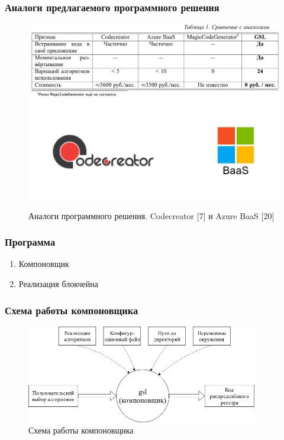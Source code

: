 \documentclass{beamer}
\begin{document}
\begin{frame}
    \frametitle{Аналоги предлагаемого программного решения}
    \begin{figure}
        \centering
        \includegraphics[width=\columnwidth]{analogues}
        \includegraphics[width=0.6\columnwidth]{analogues_logos}
        \caption{\scriptsize Аналоги программного решения. Codecreator [7] и Azure BaaS [20]}
    \end{figure}
\end{frame}

\begin{frame}[c]
    \frametitle{Программа}
    \Large
    \begin{center}
    \begin{enumerate}
        \item Компоновщик
        \item Реализация блокчейна
    \end{enumerate}
    \end{center}
\end{frame}

\begin{frame}
    \frametitle{Схема работы компоновщика}
    \begin{figure}
        \centering
        \includegraphics[width=0.9\textwidth]{komponovshik}
        \caption{\small Схема работы компоновщика}
    \end{figure}
\end{frame}
\end{document}
